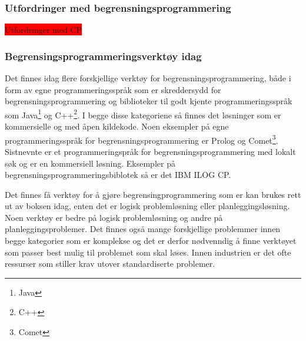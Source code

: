 \subsubsection{Utfordringer med begrensningsprogrammering}
\colorbox{red}{Utfordringer med CP}

\subsubsection{Begrensingsprogrammeringsverktøy idag}
Det finnes idag flere forskjellige verktøy for begrensningsprogrammering, både i form av egne programmeringsspråk som er skreddersydd for begrensningsprogrammering og biblioteker til godt kjente programmeringsspråk som Java\footnote{Java} og C++\footnote{C++}. I begge disse kategoriene så finnes det løsninger som er kommersielle og med åpen kildekode. Noen eksempler på egne programmeringsspråk for begrensningsprogrammering er Prolog og Comet\footnote{Comet}. Sistnevnte er et programmeringspråk for begrensningsprogrammering med lokalt søk og er en kommersiell løsning. Eksempler på begrensningsprogrammeringsbiblotek så er det IBM ILOG CP.

Det finnes få verktøy for å gjøre begrensingprogrammering som er kan brukes rett ut av boksen idag, enten det er logisk problemløsning eller planleggingsløsning. Noen verktøy er bedre på logisk problemløsning og andre på planleggingsproblemer. Det finnes også mange forskjellige problemmer innen begge kategorier som er komplekse og det er derfor nødvenndig å finne verktøyet som passer best mulig til problemet som skal løses. Innen industrien er det ofte ressurser som stiller krav utover standardiserte problemer.


